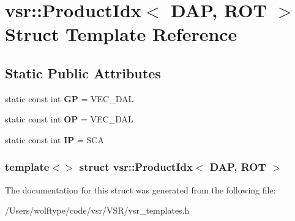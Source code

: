 \hypertarget{structvsr_1_1_product_idx_3_01_d_a_p_00_01_r_o_t_01_4}{\section{vsr\-:\-:Product\-Idx$<$ D\-A\-P, R\-O\-T $>$ Struct Template Reference}
\label{structvsr_1_1_product_idx_3_01_d_a_p_00_01_r_o_t_01_4}
}
\subsection*{Static Public Attributes}
\begin{DoxyCompactItemize}
\item 
\hypertarget{structvsr_1_1_product_idx_3_01_d_a_p_00_01_r_o_t_01_4_afa3a2450e0ace59e0a41d0da5918b103}{static const int {\bfseries G\-P} = V\-E\-C\-\_\-\-D\-A\-L}\label{structvsr_1_1_product_idx_3_01_d_a_p_00_01_r_o_t_01_4_afa3a2450e0ace59e0a41d0da5918b103}

\item 
\hypertarget{structvsr_1_1_product_idx_3_01_d_a_p_00_01_r_o_t_01_4_a280944d56553f445e38c482cfb238d5a}{static const int {\bfseries O\-P} = V\-E\-C\-\_\-\-D\-A\-L}\label{structvsr_1_1_product_idx_3_01_d_a_p_00_01_r_o_t_01_4_a280944d56553f445e38c482cfb238d5a}

\item 
\hypertarget{structvsr_1_1_product_idx_3_01_d_a_p_00_01_r_o_t_01_4_a903c02be81aa89274df3df39f908f387}{static const int {\bfseries I\-P} = S\-C\-A}\label{structvsr_1_1_product_idx_3_01_d_a_p_00_01_r_o_t_01_4_a903c02be81aa89274df3df39f908f387}

\end{DoxyCompactItemize}
\subsubsection*{template$<$$>$ struct vsr\-::\-Product\-Idx$<$ D\-A\-P, R\-O\-T $>$}



The documentation for this struct was generated from the following file\-:\begin{DoxyCompactItemize}
\item 
/\-Users/wolftype/code/vsr/\-V\-S\-R/vsr\-\_\-templates.\-h\end{DoxyCompactItemize}
